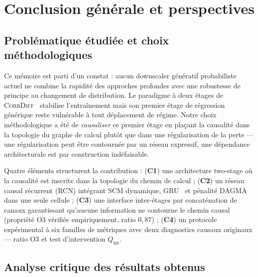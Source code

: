 \documentclass[14pt,a4paper,openany]{extreport}
\newcommand{\CorrDiff}{\textsc{CorrDiff}}
\begin{document}
\chapter*{Conclusion générale et perspectives}

\section*{Problématique étudiée et choix méthodologiques}
\label{concl:probl}

Ce mémoire est parti d'un constat : aucun downscaler génératif probabiliste actuel ne combine la rapidité des approches profondes avec une robustesse de principe au changement de distribution. Le paradigme à deux étages de \CorrDiff{}~\cite{mardani_corrdiff_2023} stabilise l'entraînement mais son premier étage de régression générique reste vulnérable à tout déplacement de régime. Notre choix méthodologique a été de \emph{causaliser} ce premier étage en plaçant la causalité dans la topologie du graphe de calcul plutôt que dans une régularisation de la perte --- une régularisation peut être contournée par un réseau expressif, une dépendance architecturale est par construction indéfaisable.

Quatre éléments structurent la contribution : (\textbf{C1}) une architecture two-stage où la causalité est inscrite dans la topologie du chemin de calcul ; (\textbf{C2}) un réseau causal récurrent (RCN) intégrant SCM dynamique, GRU~\cite{cho_gru_2014} et pénalité DAGMA~\cite{bello_dagma_2022} dans une seule cellule ; (\textbf{C3}) une interface inter-étages par concaténation de canaux garantissant qu'aucune information ne contourne le chemin causal (propriété O3 vérifiée empiriquement, ratio $0{,}87$) ; (\textbf{C4}) un protocole expérimental à six familles de métriques avec deux diagnostics causaux originaux --- ratio O3 et test d'intervention $Q_{\mathrm{int}}$.

\section*{Analyse critique des résultats obtenus}
\label{concl:analyse}
\end{document}
